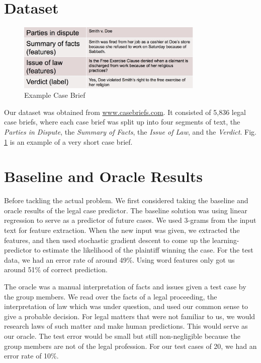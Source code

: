 \documentclass[journal]{IEEEtran}
\begin{document}
\section{Dataset}

\begin{figure}
    \centering
    \includegraphics[width=3.5in]{exampleCaseBrief.jpg}
    \caption{Example Case Brief}
    \label{fig:ExampleCaseBrief}
\end{figure}

Our dataset was obtained from \url{www.casebriefs.com}. It consisted of 5,836 legal case briefs, where each case brief was split up into four segments of text, the \textit{Parties in Dispute}, the \textit{Summary of Facts}, the \textit{Issue of Law}, and the \textit{Verdict}. Fig. \ref{fig:ExampleCaseBrief} is  an example of a very short case brief.

\section{Baseline and Oracle Results}
Before tackling the actual problem. We first considered taking the baseline and oracle results of the legal case predictor. The baseline solution was using linear regression to serve as a predictor of future cases. We used 3-grams from the input text for feature extraction.  When the new input was given, we extracted the features, and then used stochastic gradient descent to come up the learning-predictor to estimate the likelihood of the plaintiff winning the case. For the test data, we had an error rate of around 49\%. Using word features only got us around 51\% of correct prediction.

The oracle was a manual interpretation of facts and issues given a test case by the group members. We read over the facts of a legal proceeding, the interpretation of law which was under question, and used our common sense to give a probable decision. For legal matters that were not familiar to us, we would research laws of such matter and make human predictions. This would serve as our oracle. The test error would be small but still non-negligible because the group members are not of the legal profession. For our test cases of 20, we had an error rate of 10\%. 
\end{document}
